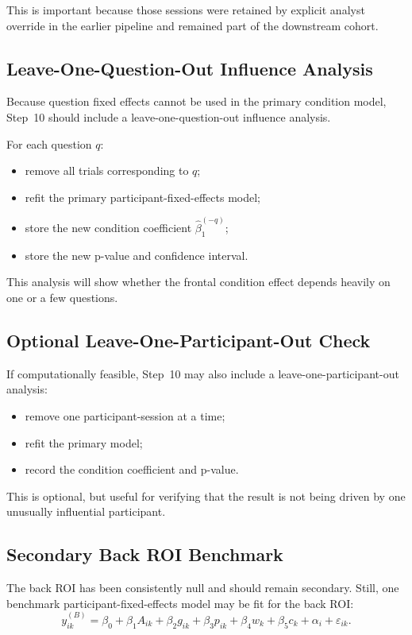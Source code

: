 This is important because those sessions were retained by explicit analyst override in the earlier
pipeline and remained part of the downstream cohort.

\subsection{Leave-One-Question-Out Influence Analysis}
Because question fixed effects cannot be used in the primary condition model, Step~10 should include
a leave-one-question-out influence analysis.

For each question \(q\):
\begin{itemize}
    \item remove all trials corresponding to \(q\);
    \item refit the primary participant-fixed-effects model;
    \item store the new condition coefficient \(\hat{\beta}_1^{(-q)}\);
    \item store the new p-value and confidence interval.
\end{itemize}

This analysis will show whether the frontal condition effect depends heavily on one or a few questions.

\subsection{Optional Leave-One-Participant-Out Check}
If computationally feasible, Step~10 may also include a leave-one-participant-out analysis:
\begin{itemize}
    \item remove one participant-session at a time;
    \item refit the primary model;
    \item record the condition coefficient and p-value.
\end{itemize}

This is optional, but useful for verifying that the result is not being driven by one unusually
influential participant.

\subsection{Secondary Back ROI Benchmark}
The back ROI has been consistently null and should remain secondary.
Still, one benchmark participant-fixed-effects model may be fit for the back ROI:
\begin{equation}
y^{(B)}_{ik}
=
\beta_0
+
\beta_1 A_{ik}
+
\beta_2 g_{ik}
+
\beta_3 p_{ik}
+
\beta_4 w_k
+
\beta_5 c_k
+
\alpha_i
+
\varepsilon_{ik}.
\end{equation}

